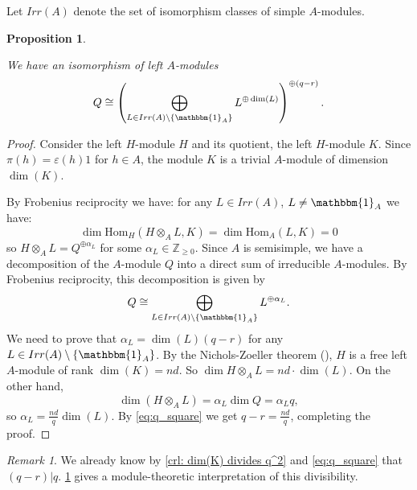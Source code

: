 \documentclass{amsart}
\theoremstyle{plain}%
\newtheorem{prop}[lemma]{Proposition}
\theoremstyle{remark}
\newtheorem{remark}[lemma]{Remark}
\newcommand{\1}{\mathbbm{1}}
\newcommand{\Z}{\mathbb{Z}}
\newcommand{\Rep}{\mathrm{Rep}}
\newcommand{\Hom}{\mathrm{Hom}}
\newcommand{\ind}{\mathrm{Ind}}
\newcommand{\res}{\mathrm{Res}}
\begin{document}
    
    Let $Irr(A)$ denote the set of isomorphism classes of simple $A$-modules.
    \begin{prop}\label{prop: structure of Res(Q)}

    We have an isomorphism of left $A$-modules
        $$Q \cong  \left(\bigoplus_{L\in Irr(A)\setminus\{\1_A\}}L^{\oplus \dim(L)}\right)^{\oplus (q-r)}.$$           
    \end{prop}
  
    \begin{proof}
    Consider the left $H$-module $H$ and its quotient, the left $H$-module $K$. Since $\pi(h)=\varepsilon(h)1$ for $h\in A$, the module $K$ is a trivial $A$-module of dimension $ \dim(K)$.
    
        
    
        By Frobenius reciprocity we have: for any $L\in Irr(A)$, $L\neq \1_A$ we have:
        $$
           \dim\Hom_H(H\otimes_A L, K)=\dim\Hom_A(L, K) =0
        $$
        so $H\otimes_A L = Q^{\oplus {\alpha_L}}$ for some $\alpha_L \in \Z_{\geq 0}$.      
        Since $A$ is semisimple, we have a decomposition of the $A$-module $Q$ into a direct sum of irreducible $A$-modules. By Frobenius reciprocity, this decomposition is given by $$Q\cong \bigoplus_{L\in Irr(A)\setminus\{\1_A\}}L^{\oplus \alpha_L}.$$
        We need to prove that $\alpha_L=\dim(L)(q-r)$ for any $L\in Irr(A)\setminus\{\1_A\}$.
        By the Nichols-Zoeller theorem (\cite{NZ}), $H$ is a free left $A$-module of rank $\dim(K) = nd$. So $\dim H\otimes_A L   = nd\cdot \dim(L)$. On the other hand, $$\dim(H\otimes_A L) = \alpha_L \dim Q = \alpha_L q,$$ so $\alpha_L = \frac{nd}{q}\dim(L)$. By \cref{eq:q_square} we get $q-r = \frac{nd}{q}$, completing the proof.
    \end{proof}
    \begin{remark}
        We already know by \cref{crl: dim(K) divides q^2} and \cref{eq:q_square} that $(q-r )\rvert q$. \cref{prop: structure of Res(Q)} gives a module-theoretic interpretation of this divisibility.
    \end{remark}
\end{document}
